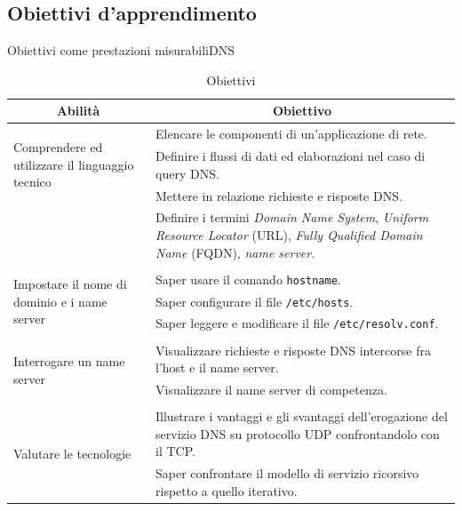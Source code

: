 \documentclass[italian]{beamer}
\begin{document}
\subsection[Obiettivi]{Obiettivi d'apprendimento}
\begin{frame}{Obiettivi come prestazioni misurabili}{DNS}
	
	
	{\tiny
	\begin{table}
		\begin{tabular}{@{}p{}p{}@{}} \toprule
			\multicolumn{1}{c}{Abilit\`a} & \multicolumn{1}{c}{Obiettivo} \\ \midrule
			
			\multirow{3}{*}{\parbox{0.2\textwidth}{Comprendere ed utilizzare il linguaggio tecnico}}
			 & Elencare le componenti di un'applicazione di rete.\\
			 & Definire i flussi di dati ed elaborazioni nel caso di query DNS.\\
			 & Mettere in relazione richieste e risposte DNS.\\
			 & Definire i termini \textit{Domain Name System}, \textit{Uniform Resource Locator} (URL), \textit{Fully Qualified Domain Name} (FQDN), \textit{name server}.\\
			 
			 \\
			 
			 \multirow{3}{*}{\parbox{0.2\textwidth}{Impostare il nome di dominio e i name server}}
			 & Saper usare il comando \texttt{hostname}.\\
			 & Saper configurare il file \texttt{/etc/hosts}.\\
			 & Saper leggere e modificare il file \texttt{/etc/resolv.conf}.\\
			  \\
			 
			 
			 \multirow{2}{*}{\parbox{0.2\textwidth}{Interrogare un name server}}
			 & Visualizzare richieste e risposte DNS intercorse fra l'host e il name server.\\
			 & Visualizzare il name server di competenza.\\
			 
			 \\
			
			 \multirow{2}{*}{\parbox{0.2\textwidth}{Valutare le tecnologie}}
			 & Illustrare i vantaggi e gli svantaggi dell'erogazione del servizio DNS su protocollo UDP confrontandolo con il TCP.\\
			 & Saper confrontare il modello di servizio ricorsivo rispetto a quello iterativo.\\
			
		\bottomrule
		\end{tabular}
		\caption{Obiettivi}
	\end{table}
	}
	
\end{frame}
\end{document}
